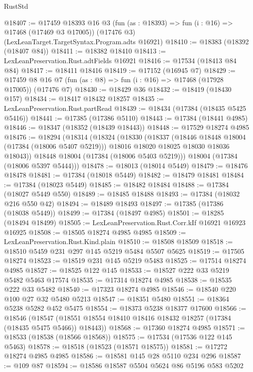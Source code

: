 \begin{lexlean}{RustStd}
\begin{coremodule}
@18407 := @17459
    @18393
    @16
    @3
    (fun (as : @18393) => fun (i : @16) => @17468 (@17469 @3 @17005))
    (@17476 @3)
    (LexLeanTarget.TargetSyntax.Program.adts @16921)
@18410 := @18383 (@18392 (@18407 @84))
@18411 := @18382 @18410
@18413 := LexLeanPreservation.Rust.adtFields @16921
@18416 := @17534 (@18413 @84 @84)
@18417 := @18411 @18416
@18419 := @17152 (@16945 @7)
@18429 := @17459 @8 @16 @7 (fun (as : @8) => fun (i : @16) => @17468 (@17928 @17005)) (@17476 @7)
@18430 := @18429 @36
@18432 := @18419 (@18430 @157)
@18434 := @18417 @18432 @18257
@18435 := LexLeanPreservation.Rust.partRead
@18439 := @18434 (@17384 (@18435 @5425 @5416))
@18441 := @17385 (@17386 @5110)
@18443 := @17384 (@18441 @4985)
@18446 := @18347 (@18352 (@18439 @18443))
@18448 := @17529 @18274 @4985
@18476 := @18294
    (@18314
      (@18324
        (@18330
          (@18337
            (@18446 @18448 @18004 (@17384 (@18006 @5407 @5219)))
            @18016
            @18020
            @18025
            @18030
            @18036
            @18043))
        @18448
        @18004
        (@17384 (@18006 @5403 @5219)))
      @18004
      (@17384 (@18006 @5397 @5444)))
@18478 := @18013 (@18014 @5449)
@18479 := @18476 @18478
@18481 := @17384 (@18018 @5449)
@18482 := @18479 @18481
@18484 := @17384 (@18023 @5449)
@18485 := @18482 @18484
@18488 := @17384 (@18027 @5449 @550)
@18489 := @18485 @18488
@18493 := @17384 (@18032 @216 @550 @42)
@18494 := @18489 @18493
@18497 := @17385 (@17386 (@18038 @5449))
@18499 := @17384 (@18497 @4985)
@18501 := @18285 (@18494 @18499)
@18505 := LexLeanPreservation.Rust.Corr.kIf @16921 @16923 @16925
@18508 := @18505 @18274 @4985 @4985
@18509 := LexLeanPreservation.Rust.Kind.plain
@18510 := @18508 @18509
@18518 := @18510 @5459 @231 @297 @145 @5219 @5484 @5507 @5625
@18519 := @17505 @18274
@18523 := @18519 @231 @145 @5219 @5483
@18525 := @17514 @18274 @4985
@18527 := @18525 @122 @145
@18533 := @18527 @222 @33 @5219 @5482 @5463 @17574
@18535 := @17314 @18274 @4985
@18538 := @18535 @222 @33 @5482
@18540 := @17323 @18274 @4985
@18546 := @18540 @220 @100 @27 @32 @5480 @5213
@18547 := @18351 @5480
@18551 := @18364 @5238 @5282 @452 @5475
@18554 := @18373 @5238 @18377 @17600
@18566 := @18546
    (@18547 (@18551 @18554 @18410 @18416 @18432 @18257 (@17384 (@18435 @5475 @5466)) @18443))
@18568 := @17360 @18274 @4985
@18571 := @18533 (@18538 (@18566 @18568))
@18575 := @17534 (@17536 @122 @145 @5463)
@18578 := @18518 (@18523 (@18571 @18575))
@18581 := @17272 @18274 @4985 @4985
@18586 := @18581 @145 @28 @5110 @234 @296
@18587 := @109 @87
@18594 := @18586 @18587 @5504 @5624 @86 @5196 @583 @5202

\end{coremodule}
\end{lexlean}
